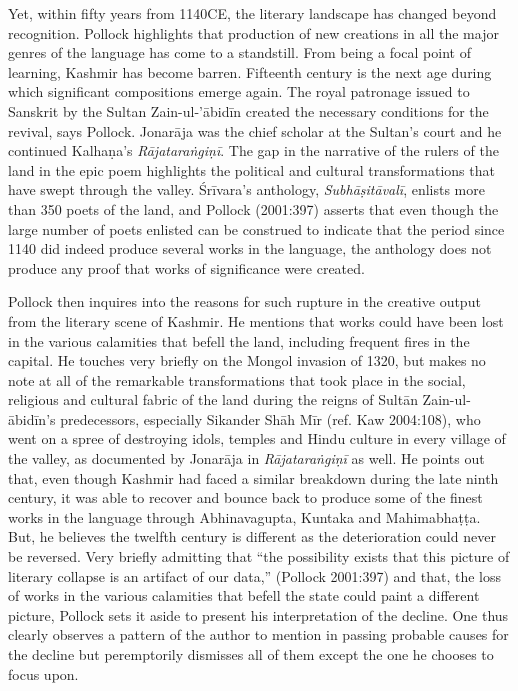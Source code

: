 Yet, within fifty years from 1140CE, the literary landscape has changed beyond recognition. Pollock highlights that production of new creations in all the major genres of the language has come to a standstill. From being a focal point of learning, Kashmir has become barren. Fifteenth century is the next age during which significant compositions emerge again. The royal patronage issued to Sanskrit by the Sultan Zain-ul-’ābidīn created the necessary conditions for the revival, says Pollock. Jonarāja was the chief scholar at the Sultan’s court and he continued Kalhaṇa’s {\sl Rājataraṅgiṇī}. The gap in the narrative of the rulers of the land in the epic poem highlights the political and cultural transformations that have swept through the valley. Śrīvara’s anthology, {\sl Subhāṣitāvalī}, enlists more than 350 poets of the land, and Pollock (2001:397) asserts that even though the large number of poets enlisted can be construed to indicate that the period since 1140 did indeed produce several works in the language, the anthology does not produce any proof that works of significance were created.

Pollock then inquires into the reasons for such rupture in the creative output from the literary scene of Kashmir. He mentions that works could have been lost in the various calamities that befell the land, including frequent fires in the capital. He touches very briefly on the Mongol invasion of 1320, but makes no note at all of the remarkable transformations that took place in the social, religious and cultural fabric of the land during the reigns of Sultān Zain-ul-ābidīn’s predecessors, especially Sikander Shāh Mīr (ref. Kaw 2004:108), who went on a spree of destroying idols, temples and Hindu culture in every village of the valley, as documented by Jonarāja in {\sl Rājataraṅgiṇī} as well. He points out that, even though Kashmir had faced a similar breakdown during the late ninth century, it was able to recover and bounce back to produce some of the finest works in the language through Abhinavagupta, Kuntaka and Mahimabhaṭṭa. But, he believes the twelfth century is different as the deterioration could never be reversed. Very briefly admitting that “the possibility exists that this picture of literary collapse is an artifact of our data,” (Pollock 2001:397) and that, the loss of works in the various calamities that befell the state could paint a different picture, Pollock sets it aside to present his interpretation of the decline. One thus clearly observes a pattern of the author to mention in passing probable causes for the decline but peremptorily dismisses all of them except the one he chooses to focus upon.

